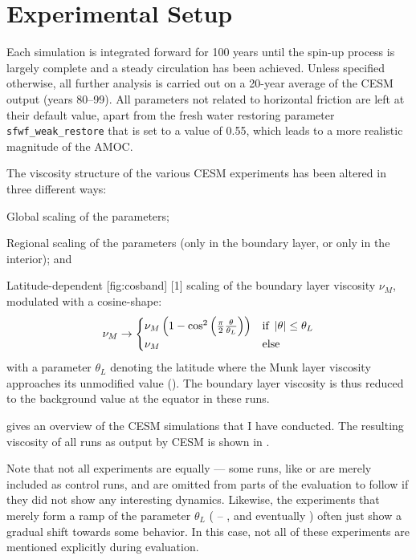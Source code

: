 \clearpage
\section{Experimental Setup}
\label{sec:cesm-setup}
Each simulation is integrated forward for 100 years until the spin-up process is largely complete and a steady circulation has been achieved. Unless specified otherwise, all further analysis is carried out on a 20-year average of the \ac{CESM} output (years 80--99). All parameters not related to horizontal friction are left at their default value, apart from the fresh water restoring parameter \verb|sfwf_weak_restore| that is set to a value of \num{0.55}, which leads to a more realistic magnitude of the \ac{AMOC}.

The viscosity structure of the various \ac{CESM} experiments has been altered in three different ways:
%
\begin{enum}
	\item Global scaling of the parameters;
	\item Regional scaling of the parameters (\ie only in the boundary layer, or only in the interior); and
	\item Latitude-dependent%
	[fig:cosband]%
	{}[1]%
	scaling of the boundary layer viscosity \(\nu_M\), modulated with a cosine-shape:
	\begin{equation}
	\nu_M \to \begin{cases}
	\nu_M \left(1 - \cos^2\left(\frac{\pi}{2}\frac{\theta}{\theta_L}\right)\right) & \text{if } \left| \theta \right| \leq \theta_L \\ \nu_M & \text{else}
	\end{cases}
	\end{equation}
	with a parameter \(\theta_L\) denoting the latitude where the Munk layer viscosity approaches its unmodified value (). The boundary layer viscosity is thus reduced to the background value at the equator in these runs.
\end{enum}
%
 gives an overview of the \ac{CESM} simulations that I have conducted. The resulting viscosity of all runs as output by \ac{CESM} is shown in . 

Note that not all experiments are equally  --- some runs, like  or  are merely included as control runs, and are omitted from parts of the evaluation to follow if they did not show any interesting dynamics. Likewise, the experiments that merely form a ramp of the parameter \(\theta_L\) (\ie {} -- , and eventually ) often just show a gradual shift towards some behavior. In this case, not all of these experiments are mentioned explicitly during evaluation.

